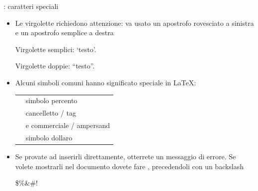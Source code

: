 \documentclass{beamer}
\begin{document}
\begin{frame}[fragile]{\insertsubsection{}: caratteri speciali}
\small
\begin{itemize}
\item Le virgolette richiedono attenzione: va usato un apostrofo rovesciato \keystroke{\`{}} a sinistra e un apostrofo semplice \keystroke{\'{}} a destra
\begin{exampletwouptiny}
Virgolette semplici: `testo'.

Virgolette doppie: ``testo''.
\end{exampletwouptiny}

\item Alcuni simboli comuni hanno significato speciale in \LaTeX:\\[1ex]
\begin{tabular}{cl}
\keystrokebftt{\%} & simbolo percento			\\
\keystrokebftt{\#} & cancelletto / tag			\\
\keystrokebftt{\&} & e commerciale / ampersand	\\
\keystrokebftt{\$} & simbolo dollaro			\\
\end{tabular}
\item Se provate ad inserirli direttamente, otterrete un messaggio di errore.
Se volete mostrarli nel documento dovete fare ,
precedendoli con un backslash \keystrokebftt{\bs}
\begin{exampletwouptiny}
\$\%\&\#!
\end{exampletwouptiny}
\end{itemize}
\end{frame}
\end{document}
